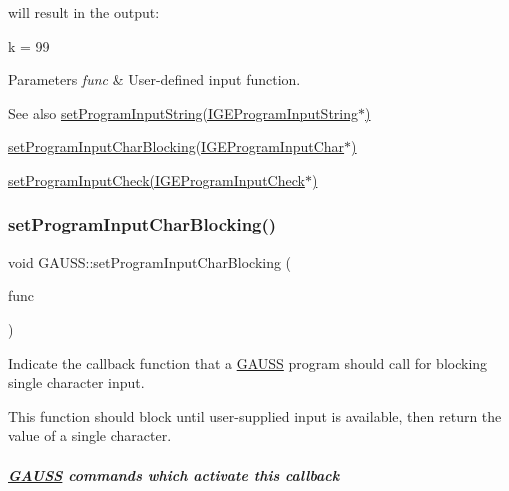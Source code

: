 will result in the output\+: 
\begin{DoxyCode}
k = 99
\end{DoxyCode}



\begin{DoxyParams}{Parameters}
{\em func} & User-\/defined input function.\\
\hline
\end{DoxyParams}
\begin{DoxySeeAlso}{See also}
\hyperlink{class_g_a_u_s_s_ae82b5bfdf26971433c46936a812506c3}{set\+Program\+Input\+String(\+I\+G\+E\+Program\+Input\+String$\ast$)} 

\hyperlink{class_g_a_u_s_s_a300d6e33dbfd2a45f56ff2769f585435}{set\+Program\+Input\+Char\+Blocking(\+I\+G\+E\+Program\+Input\+Char$\ast$)} 

\hyperlink{class_g_a_u_s_s_a6517b404cf71d157808a1cb73e3c0ddb}{set\+Program\+Input\+Check(\+I\+G\+E\+Program\+Input\+Check$\ast$)} 
\end{DoxySeeAlso}
\mbox{\label{class_g_a_u_s_s_a300d6e33dbfd2a45f56ff2769f585435}} 
\subsubsection{\texorpdfstring{set\+Program\+Input\+Char\+Blocking()}{setProgramInputCharBlocking()}}
{\footnotesize\ttfamily void G\+A\+U\+S\+S\+::set\+Program\+Input\+Char\+Blocking (\begin{DoxyParamCaption}\item[{\hyperlink{class_i_g_e_program_input_char}{I\+G\+E\+Program\+Input\+Char} $\ast$}]{func }\end{DoxyParamCaption})\hspace{0.3cm}{\ttfamily [static]}}



Indicate the callback function that a \hyperlink{class_g_a_u_s_s}{G\+A\+U\+SS} program should call for blocking single character input. 

This function should block until user-\/supplied input is available, then return the value of a single character.

\subparagraph*{\hyperlink{class_g_a_u_s_s}{G\+A\+U\+SS} commands which activate this callback}



